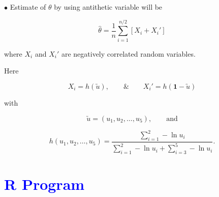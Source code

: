 \documentclass[11pt, a4paper]{article}\usepackage[]{graphicx}\usepackage[]{xcolor}
\begin{document}
$\bullet$ Estimate of $\theta$ by using antithetic variable will be

$$\widehat{\theta} = \dfrac{1}{n} \sum \limits_{i = 1}^{n/2} [X_i + X_i']$$

where $X_i$ and $X_i'$ are negatively correlated random variables.

\newpage

Here

$$X_i = h(\utilde{u}), \qquad \& \qquad X_i' = h(\mathbf{1} - \utilde{u})$$

with

$$\utilde{u} = (u_1, u_2, \ldots, u_5), \qquad \text{and}$$

$$h(u_1, u_2, \ldots, u_5) = \dfrac{\sum \limits_{i = 1}^{2} - \ln u_i}{\sum \limits_{i = 1}^{2} - \ln u_i + \sum \limits_{i = 3}^{5} - \ln u_i}.$$

\section*{\faArrowAltCircleRight[regular] \textcolor{blue}{R Program}}
\end{document}
